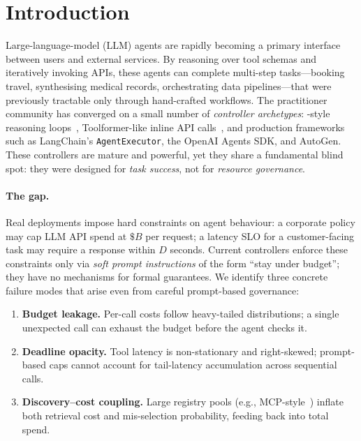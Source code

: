 \section{Introduction}
\label{sec:intro}

Large-language-model (LLM) agents are rapidly becoming a primary
interface between users and external services. By reasoning over tool
schemas and iteratively invoking APIs, these agents can complete
multi-step tasks---booking travel, synthesising medical records,
orchestrating data pipelines---that were previously tractable only
through hand-crafted workflows. The practitioner community has
converged on a small number of \emph{controller archetypes}:
\ReAct-style reasoning loops~\cite{yao2023react},
Toolformer-like inline API calls~\cite{schick2023toolformer},
and production frameworks such as LangChain's
\texttt{AgentExecutor}, the OpenAI Agents SDK, and AutoGen.
These controllers are mature and powerful, yet they share a
fundamental blind spot: they were designed for \emph{task success},
not for \emph{resource governance}.

\paragraph{The gap.}
Real deployments impose hard constraints on agent behaviour: a
corporate policy may cap LLM API spend at $\$B$ per request; a
latency SLO for a customer-facing task may require a response within
$D$ seconds. Current controllers enforce these constraints only via
\emph{soft prompt instructions} of the form ``stay under budget'';
they have no mechanisms for formal guarantees. We identify three
concrete failure modes that arise even from careful prompt-based
governance:
\begin{enumerate}
  \item \textbf{Budget leakage.} Per-call costs follow heavy-tailed
    distributions; a single unexpected call can exhaust the budget
    before the agent checks it.
  \item \textbf{Deadline opacity.} Tool latency is non-stationary
    and right-skewed; prompt-based caps cannot account for
    tail-latency accumulation across sequential calls.
  \item \textbf{Discovery--cost coupling.} Large registry pools
    (e.g., MCP-style~\cite{mcp2024}) inflate both retrieval cost
    and mis-selection probability, feeding back into total spend.
\end{enumerate}

